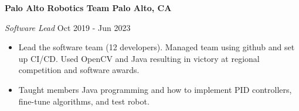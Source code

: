 \textbf{Palo Alto Robotics Team \hfill Palo Alto, CA}\par
\textit{Software Lead} \hfill Oct 2019 - Jun 2023
\begin{itemize}
	\item Lead the software team (12 developers). Managed team using github and set up CI/CD. Used OpenCV and Java resulting in victory at regional competition and software awards.
        \item Taught members Java programming and how to implement PID controllers, fine-tune algorithms, and test robot.
\end{itemize}\par